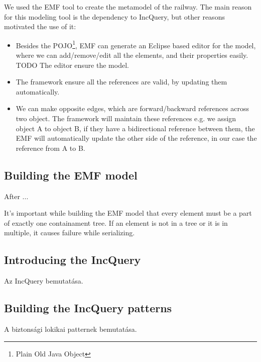 We used the EMF tool to create the metamodel of the railway. The main reason for this modeling tool is the dependency to IncQuery, but other reasons motivated the use of it:
\begin{itemize}
	\item Besides the POJO\footnote{Plain Old Java Object}, EMF can generate an Eclipse based editor for the model, where we can add/remove/edit all the elements, and their properties easily. TODO The editor ensure the model.
	\item The framework ensure all the references are valid, by updating them automatically.
	\item We can make opposite edges, which are forward/backward references across two object. The framework will maintain these references e.g. we assign object A to object B, if they have a bidirectional reference between them, the EMF will automatically update the other side of the reference, in our case the reference from A to B.
\end{itemize}

\subsection{Building the EMF model}

After ...

It's important while building the EMF model that every element must be a part of exactly one containament tree. If an element is not in a tree or it is in multiple, it causes failure while serializing.

\subsection{Introducing the IncQuery}
Az IncQuery bemutatása.
\subsection{Building the IncQuery patterns}
\label{sec:case_study:pattern_building}
A biztonsági lokikai patternek bemutatása.